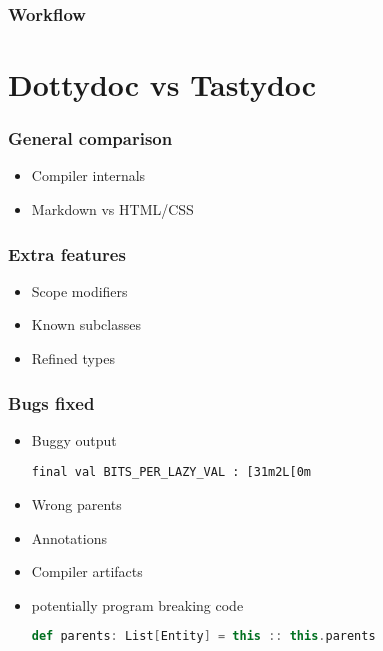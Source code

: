 \documentclass{beamer}
\begin{document}
\begin{frame}
  \frametitle{Workflow}
  \begin{center}
  \end{center}
\end{frame}

\section{Dottydoc vs Tastydoc}

\begin{frame}
  \frametitle{General comparison}
  \begin{itemize}
    \item Compiler internals \pause
    \item Markdown vs HTML/CSS
  \end{itemize}
\end{frame}

\begin{frame}
  \frametitle{Extra features}
  \begin{itemize}
    \item Scope modifiers \pause
    \item Known subclasses \pause
    \item Refined types
  \end{itemize}
\end{frame}

\begin{frame}[fragile]
  \frametitle{Bugs fixed}
  \begin{itemize}
    \item Buggy output
\begin{lstlisting}
final val BITS_PER_LAZY_VAL : [31m2L[0m
\end{lstlisting}\pause
    \item Wrong parents \pause
    \item Annotations \pause
    \item Compiler artifacts \pause
    \item potentially program breaking code
\begin{lstlisting}[language=scala]
def parents: List[Entity] = this :: this.parents
\end{lstlisting}
  \end{itemize}
\end{frame}
\end{document}
